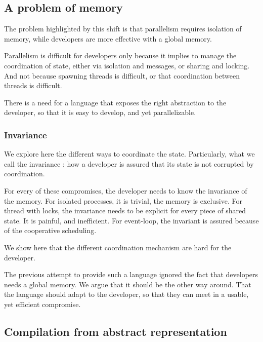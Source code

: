 

\subsection{A problem of memory}

The problem highlighted by this shift is that parallelism requires isolation of memory, while developers are more effective with a global memory.

Parallelism is difficult for developers only because it implies to manage the coordination of state, either via isolation and messages, or sharing and locking.
And not because spawning threads is difficult, or that coordination between threads is difficult.

There is a need for a language that exposes the right abstraction to the developer, so that it is easy to develop, and yet parallelizable.

\subsubsection{Invariance}

We explore here the different ways to coordinate the state.
Particularly, what we call the invariance : how a developer is assured that its state is not corrupted by coordination.

For every of these compromises, the developer needs to know the invariance of the memory.
For isolated processes, it is trivial, the memory is exclusive.
For thread with locks, the invariance needs to be explicit for every piece of shared state. It is painful, and inefficient.
For event-loop, the invariant is assured because of the cooperative scheduling.

We show here that the different coordination mechanism are hard for the developer.

The previous attempt to provide such a language ignored the fact that developers needs a global memory. 
We argue that it should be the other way around.
That the language should adapt to the developer, so that they can meet in a usable, yet efficient compromise.



\subsection{Compilation from abstract representation}

